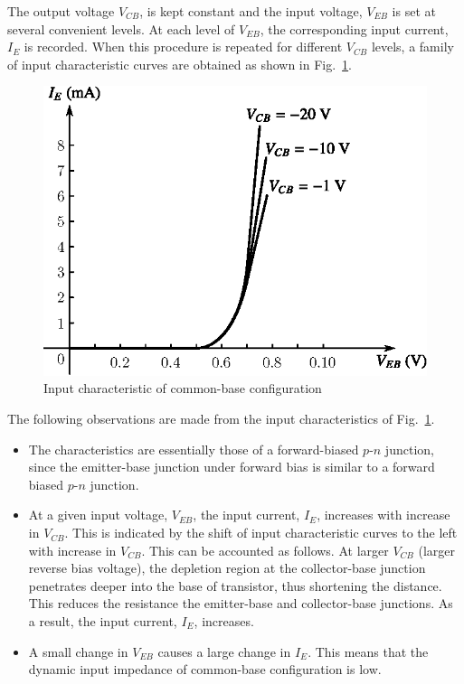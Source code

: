 The output voltage $V_{CB}$, is kept constant and the input voltage, $V_{EB}$ is set at several convenient levels. At each level of $V_{EB}$, the corresponding input current, $I_{E}$ is recorded. When this procedure is repeated for different $V_{CB}$ levels, a family of input characteristic curves are obtained as shown in Fig.~\ref{fig3.19}.
\begin{figure}[H]
\centering
\includegraphics{chap2/fig2.19.eps}
\caption{Input characteristic of common-base configuration}\label{fig3.19}
\end{figure}

The following observations are made from the input characteristics of Fig.~\ref{fig3.19}.
\begin{itemize}
\itemsep=2pt
\item The characteristics are essentially those of a forward-biased $p$-$n$ junction, since the emitter-base junction under forward bias is similar to a forward biased $p$-$n$ junction.

\item At a given input voltage, $V_{EB}$, the input current, $I_{E}$, increases with increase in $V_{CB}$. This is indicated by the shift of input characteristic curves to the left with increase in $V_{CB}$. This can be accounted as follows. At larger $V_{CB}$ (larger reverse bias voltage), the depletion region at the collector-base junction penetrates deeper into the base of transistor, thus shortening the distance. This reduces the resistance the emitter-base and collector-base junctions. As a result, the input current, $I_{E}$, increases.

\item A small change in $V_{EB}$ causes a large change in $I_{E}$. This means that the dynamic input impedance of common-base configuration is low.
\end{itemize}

